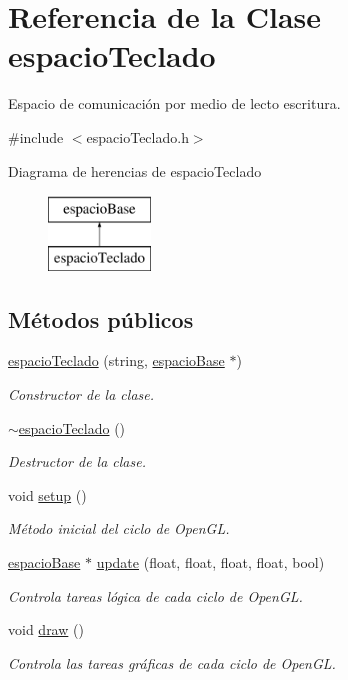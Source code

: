 \hypertarget{classespacio_teclado}{}\section{Referencia de la Clase espacio\+Teclado}
\label{classespacio_teclado}


Espacio de comunicación por medio de lecto escritura.  




{\ttfamily \#include $<$espacio\+Teclado.\+h$>$}

Diagrama de herencias de espacio\+Teclado\begin{figure}[H]
\begin{center}
\leavevmode
\includegraphics[height=2.000000cm]{classespacio_teclado}
\end{center}
\end{figure}
\subsection*{Métodos públicos}
\begin{DoxyCompactItemize}
\item 
\hyperlink{classespacio_teclado_a7bdaaa950b5673a464f322382aaf95cd}{espacio\+Teclado} (string, \hyperlink{classespacio_base}{espacio\+Base} $\ast$)
\begin{DoxyCompactList}\small\item\em Constructor de la clase. \end{DoxyCompactList}\item 
\hyperlink{classespacio_teclado_a98b147b70f0ce7a5bc6805d786f84cc4}{$\sim$espacio\+Teclado} ()
\begin{DoxyCompactList}\small\item\em Destructor de la clase. \end{DoxyCompactList}\item 
void \hyperlink{classespacio_teclado_ac6bad9b2d302639b45fbee4aed2f094d}{setup} ()
\begin{DoxyCompactList}\small\item\em Método inicial del ciclo de Open\+G\+L. \end{DoxyCompactList}\item 
\hyperlink{classespacio_base}{espacio\+Base} $\ast$ \hyperlink{classespacio_teclado_a0d5aa4cb23a134cfce3f00709fd2f831}{update} (float, float, float, float, bool)
\begin{DoxyCompactList}\small\item\em Controla tareas lógica de cada ciclo de Open\+G\+L. \end{DoxyCompactList}\item 
void \hyperlink{classespacio_teclado_a1215fd9d4030c2642d2fbe6a4cf86589}{draw} ()
\begin{DoxyCompactList}\small\item\em Controla las tareas gráficas de cada ciclo de Open\+G\+L. \end{DoxyCompactList}\end{DoxyCompactItemize}
